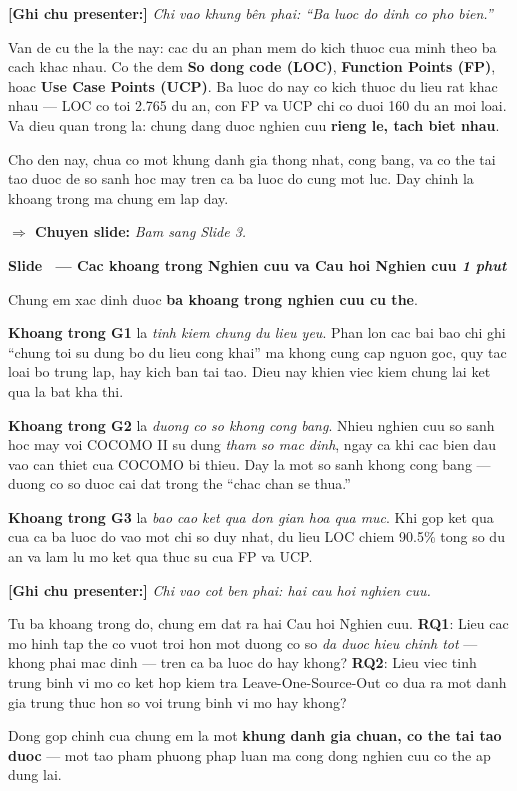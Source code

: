 \documentclass[12pt,a4paper]{article}
\newcounter{slidenum}
\newcommand{\slide}[2]{%
  \stepcounter{slidenum}%
  \vspace{0.6em}
  \begin{mdframed}[backgroundcolor=slideblue!90, linecolor=slideblue,
    leftmargin=0pt, rightmargin=0pt, innerleftmargin=10pt,
    innerrightmargin=10pt, innertopmargin=6pt, innerbottommargin=6pt]
    \color{white}\large\bfseries Slide \theslidenum\ --- #1
    \hfill \textcolor{yellow!80!white}{\normalsize\itshape #2}
  \end{mdframed}
  \vspace{0.3em}
}
\newcommand{\say}[1]{%
  \begin{mdframed}[backgroundcolor=bglight, linecolor=slideblue!40,
    leftmargin=0pt, rightmargin=0pt, innerleftmargin=12pt,
    innerrightmargin=12pt, innertopmargin=8pt, innerbottommargin=8pt,
    linewidth=1.5pt]
  #1
  \end{mdframed}
}
\newcommand{\pointnote}[1]{%
  \vspace{0.2em}
  \noindent\textcolor{noteorange}{\bfseries [Ghi chu presenter:]} \textit{#1}
  \vspace{0.2em}
}
\newcommand{\transition}[1]{%
  \vspace{0.15em}
  \noindent\textcolor{timergreen}{\bfseries $\Rightarrow$ Chuyen slide:} \textit{#1}
  \vspace{0.3em}
}
\begin{document}
\pointnote{Chi vao khung bên phai: ``Ba luoc do dinh co pho bien.''}

\say{
Van de cu the la the nay: cac du an phan mem do kich thuoc cua minh theo ba cach khac nhau. Co the dem \textbf{So dong code (LOC)}, \textbf{Function Points (FP)}, hoac \textbf{Use Case Points (UCP)}. Ba luoc do nay co kich thuoc du lieu rat khac nhau --- LOC co toi 2.765 du an, con FP va UCP chi co duoi 160 du an moi loai. Va dieu quan trong la: chung dang duoc nghien cuu \textbf{rieng le, tach biet nhau}.

Cho den nay, chua co mot khung danh gia thong nhat, cong bang, va co the tai tao duoc de so sanh hoc may tren ca ba luoc do cung mot luc. Day chinh la khoang trong ma chung em lap day.
}

\transition{Bam sang Slide 3.}

\slide{Cac khoang trong Nghien cuu va Cau hoi Nghien cuu}{1 phut}

\say{
Chung em xac dinh duoc \textbf{ba khoang trong nghien cuu cu the}.

\textbf{Khoang trong G1} la \textit{tinh kiem chung du lieu yeu}. Phan lon cac bai bao chi ghi ``chung toi su dung bo du lieu cong khai'' ma khong cung cap nguon goc, quy tac loai bo trung lap, hay kich ban tai tao. Dieu nay khien viec kiem chung lai ket qua la bat kha thi.

\textbf{Khoang trong G2} la \textit{duong co so khong cong bang}. Nhieu nghien cuu so sanh hoc may voi COCOMO II su dung \textit{tham so mac dinh}, ngay ca khi cac bien dau vao can thiet cua COCOMO bi thieu. Day la mot so sanh khong cong bang --- duong co so duoc cai dat trong the ``chac chan se thua.''

\textbf{Khoang trong G3} la \textit{bao cao ket qua don gian hoa qua muc}. Khi gop ket qua cua ca ba luoc do vao mot chi so duy nhat, du lieu LOC chiem 90.5\% tong so du an va lam lu mo ket qua thuc su cua FP va UCP.
}

\pointnote{Chi vao cot ben phai: hai cau hoi nghien cuu.}

\say{
Tu ba khoang trong do, chung em dat ra hai Cau hoi Nghien cuu. \textbf{RQ1}: Lieu cac mo hinh tap the co vuot troi hon mot duong co so \textit{da duoc hieu chinh tot} --- khong phai mac dinh --- tren ca ba luoc do hay khong? \textbf{RQ2}: Lieu viec tinh trung binh vi mo co ket hop kiem tra Leave-One-Source-Out co dua ra mot danh gia trung thuc hon so voi trung binh vi mo hay khong?

Dong gop chinh cua chung em la mot \textbf{khung danh gia chuan, co the tai tao duoc} --- mot tao pham phuong phap luan ma cong dong nghien cuu co the ap dung lai.
}
\end{document}
